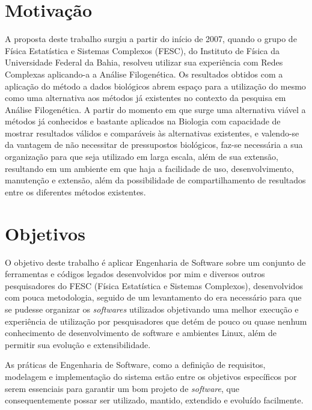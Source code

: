 \section{Motivação}

A proposta deste trabalho surgiu a partir do início de 2007, quando o grupo de Física Estatística e Sistemas Complexos (FESC),
do Instituto de Física da Universidade Federal da Bahia, resolveu utilizar sua experiência com Redes Complexas aplicando-a a Análise Filogenética.
Os resultados obtidos com a aplicação do método a dados biológicos abrem espaço para a utilização do mesmo como uma alternativa aos métodos
já existentes no contexto da pesquisa em Análise Filogenética. A partir do momento em que surge uma alternativa viável a métodos já conhecidos
e bastante aplicados na Biologia com capacidade de mostrar resultados válidos e comparáveis às alternativas existentes, e valendo-se da vantagem
de não necessitar de pressupostos biológicos, faz-se necessária a sua organização para que seja utilizado em larga escala, além de sua extensão,
resultando em um ambiente em que haja a facilidade de uso, desenvolvimento, manutenção e extensão, além da possibilidade de compartilhamento de
resultados entre os diferentes métodos existentes.

\section{Objetivos} \label{sec:objetivos}

O objetivo deste trabalho é aplicar Engenharia de Software sobre um conjunto de ferramentas e códigos legados desenvolvidos por mim e diversos outros
pesquisadores do FESC (Física Estatística e Sistemas Complexos), desenvolvidos com pouca metodologia, seguido de um levantamento do era necessário para que
se pudesse organizar os \textit{softwares} utilizados objetivando uma melhor execução e experiência de utilização por pesquisadores que detém de pouco
ou quase nenhum conhecimento de desenvolvimento de software e ambientes Linux, além de permitir sua evolução e extensibilidade.

As práticas de Engenharia de Software, como a definição de requisitos, modelagem e implementação do sistema estão entre os objetivos específicos por serem
essenciais para garantir um bom projeto de \textit{software}, que consequentemente possar ser utilizado, mantido, extendido e evoluído facilmente.



